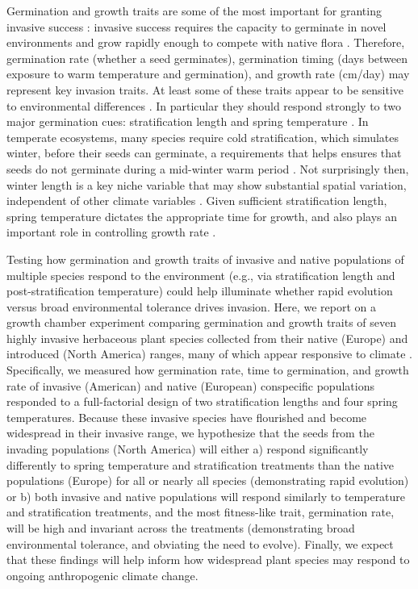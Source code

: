 \documentclass[12pt]{article}\usepackage[]{graphicx}\usepackage[]{color}
\begin{document}
	Germination and growth traits are some of the most important for granting invasive success \parencite{Sattin1997, Maillet2000}: invasive success requires the capacity to germinate in novel environments and grow rapidly enough to compete with native flora \parencite{Grime1988, Gioria2017}. Therefore, germination rate (whether a seed germinates), germination timing (days between exposure to warm temperature and germination), and growth rate (cm/day) may represent key invasion traits. At least some of these traits appear to be sensitive to environmental differences \parencite{Leger2007}.  In particular they should respond strongly to two major germination cues: stratification length and spring temperature \parencite{Finch2006}. In temperate ecosystems, many species require cold stratification, which simulates winter, before their seeds can germinate, a requirements that helps ensures that seeds do not germinate during a mid-winter warm period \parencite{Baskin1998,Popay1970,Wulff1994}. Not surprisingly then, winter length is a key niche variable \parencite{Harte2015} that may show substantial spatial variation, independent of other climate variables \parencite{Bonan2003}. Given sufficient stratification length, spring temperature dictates the appropriate time for growth, and also plays an important role in controlling growth rate \parencite{Egli1980,Guilioni2003}. %
	
Testing how germination and growth traits of invasive and native populations of multiple species respond to the environment (e.g., via stratification length and post-stratification temperature) could help illuminate whether rapid evolution versus broad environmental tolerance drives invasion. Here, we report on a growth chamber experiment comparing germination and growth traits of seven highly invasive herbaceous plant species collected from their native (Europe) and introduced (North America) ranges, many of which appear responsive to climate \parencite{Wolkovich2014}. Specifically, we measured how germination rate, time to germination, and growth rate of invasive (American) and native (European) conspecific populations responded to a full-factorial design of two stratification lengths and four spring temperatures. Because these invasive species have flourished and become widespread in their invasive range, we hypothesize that the seeds from the invading populations (North America) will either a)  respond significantly differently to spring temperature and stratification treatments than the native populations (Europe) for all or nearly all species (demonstrating rapid evolution) or b) both invasive and native populations will respond similarly to temperature and stratification treatments, and the most fitness-like trait, germination rate, will be high and invariant across the treatments (demonstrating broad environmental tolerance, and obviating the need to evolve). Finally, we expect that these findings will help inform how widespread plant species may respond to ongoing anthropogenic climate change. 
\end{document}
